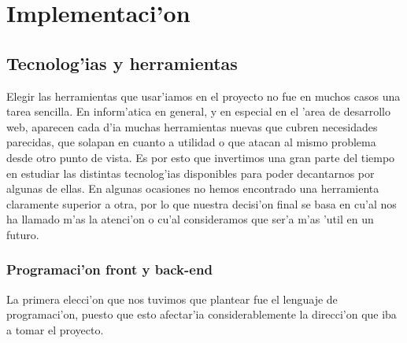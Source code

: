 \section{Implementaci'on}
\label{sec:implementacion}



\subsection{Tecnolog'ias y herramientas}
\label{sec:tecnologias_y_herramientas}

Elegir las herramientas que usar'iamos en el proyecto no fue en muchos casos una tarea sencilla. En inform'atica en general,
y en especial en el 'area de desarrollo web, aparecen cada d'ia muchas herramientas nuevas que cubren necesidades parecidas,
que solapan en cuanto a utilidad o que atacan al mismo problema desde otro punto de vista. Es por esto que
invertimos una gran parte del tiempo en estudiar las distintas tecnolog'ias disponibles para poder decantarnos por algunas
de ellas. En algunas ocasiones no hemos encontrado una herramienta claramente superior a otra, por lo que nuestra decisi'on
final se basa en cu'al nos ha llamado m'as la atenci'on o cu'al consideramos que ser'a m'as 'util en un futuro.

\subsubsection[Programaci'on front y back-end (FDB)]{Programaci'on front y back-end}
\label{sub:programacion_front_y_back_end}

La primera elecci'on que nos tuvimos que plantear fue el lenguaje de programaci'on, puesto que esto afectar'ia considerablemente
la direcci'on que iba a tomar el proyecto. 

